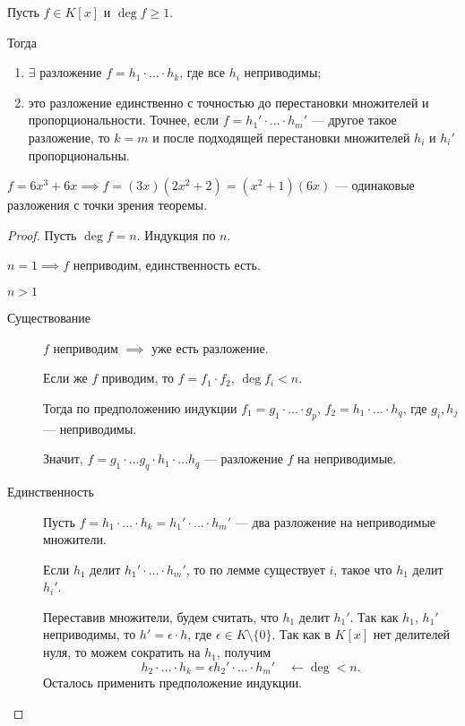 \begin{theorem}
    Пусть $f \in K[x]$ и $\deg f \geq 1$.

    Тогда
    \begin{enumerate}
    \item $\exists$ разложение $f = h_1 \cdot \ldots \cdot h_k$, где все $h_i$ неприводимы;
    \item это разложение единственно с точностью до перестановки множителей и пропорциональности. Точнее, если $f = h_1' \cdot \ldots \cdot h_m'$ --- другое такое разложение, то $k = m$ и после подходящей перестановки множителей $h_i$ и $h_i'$ пропорциональны.
    \end{enumerate}
\end{theorem}

\begin{example}
    $f = 6x^3 + 6x \implies f = (3x)(2x^2 + 2) = (x^2 + 1)(6x)$ --- одинаковые разложения с точки зрения теоремы.
\end{example}

\begin{proof}
    Пусть $\deg f = n$. Индукция по $n$.

    $n = 1 \implies f$ неприводим, единственность есть.

    \bigskip
    $n > 1$
    \begin{description}
    \item[Существование] $f$ неприводим $ \implies $ уже есть разложение.

        Если же $f$ приводим, то $f = f_1 \cdot f_2$, $\deg f_i < n$.

        Тогда по предположению индукции $f_1 = g_1 \cdot \ldots \cdot g_p$, $f_2 = h_1 \cdot \ldots \cdot h_q$, где $g_i, h_j$ --- неприводимы.

        Значит, $f = g_1 \cdot \ldots g_q \cdot h_1 \cdot \ldots h_q$ --- разложение $f$ на неприводимые.

    \item[Единственность] Пусть $f = h_1 \cdot \ldots \cdot h_k = h_1' \cdot \ldots \cdot h_m'$ --- два разложение на неприводимые множители.

        Если $h_1$ делит $h_1' \cdot \ldots \cdot h_m'$, то по лемме существует $i$, такое что $h_1$ делит $h_i'$.

        Переставив множители, будем считать, что $h_1$ делит $h_1'$. Так как $h_1$, $h_1'$ неприводимы, то $h' = \epsilon \cdot h$, где $\epsilon \in K \setminus \{0\}$. Так как в $K[x]$ нет делителей нуля, то можем сократить на $h_1$, получим
        \begin{equation*}
            h_2 \cdot \ldots \cdot h_k = \epsilon h_2' \cdot \ldots \cdot h_m' \quad \leftarrow \deg < n
        .\end{equation*}
        Осталось применить предположение индукции.
        \qedhere
    \end{description}
\end{proof}

\begin{comment}~
    \begin{enumerate}
    \item Всякое КГИ факториально;
    \item $K[x_1, \dots, x_n]$, $n \geq 2$ --- это не КГИ, но тоже факториально.
    \end{enumerate}
\end{comment}
